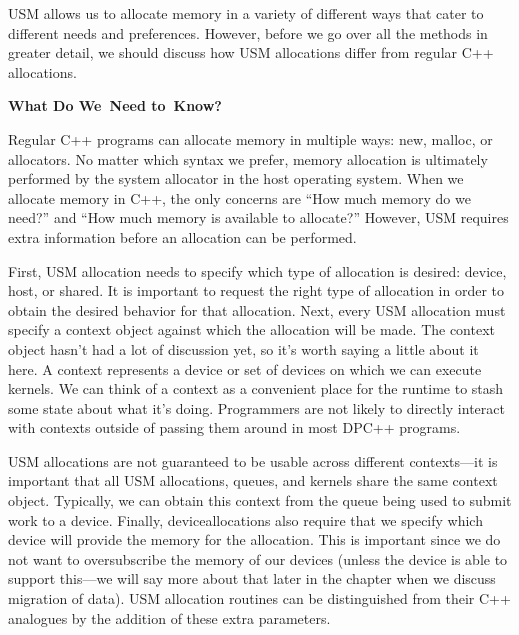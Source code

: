 USM allows us to allocate memory in a variety of different ways that cater to different needs and preferences. However, before we go over all the methods in greater detail, we should discuss how USM allocations differ from regular C++ allocations.\par

\hspace*{\fill} \par %
\textbf{What Do We Need to Know?}

Regular C++ programs can allocate memory in multiple ways: new, malloc, or allocators. No matter which syntax we prefer, memory allocation is ultimately performed by the system allocator in the host operating system. When we allocate memory in C++, the only concerns are “How much memory do we need?” and “How much memory is available to allocate?” However, USM requires extra information before an allocation can be performed.\par

First, USM allocation needs to specify which type of allocation is desired: device, host, or shared. It is important to request the right type of allocation in order to obtain the desired behavior for that allocation. Next, every USM allocation must specify a context object against which the allocation will be made. The context object hasn’t had a lot of discussion yet, so it’s worth saying a little about it here. A context represents a device or set of devices on which we can execute kernels. We can think of a context as a convenient place for the runtime to stash some state about what it’s doing. Programmers are not likely to directly interact with contexts outside of passing them around in most DPC++ programs.\par

USM allocations are not guaranteed to be usable across different contexts—it is important that all USM allocations, queues, and kernels share the same context object. Typically, we can obtain this context from the queue being used to submit work to a device. Finally, deviceallocations also require that we specify which device will provide the memory for the allocation. This is important since we do not want to oversubscribe the memory of our devices (unless the device is able to support this—we will say more about that later in the chapter when we discuss migration of data). USM allocation routines can be distinguished from their C++ analogues by the addition of these extra parameters.\par

